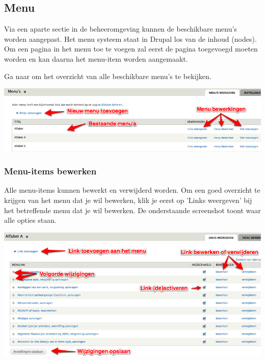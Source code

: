 \subsection{Menu}\label{menu}
Via een aparte sectie in de beheeromgeving kunnen de beschikbare menu's worden aangepast. Het menu systeem staat in Drupal los van de inhoud (nodes). Om een pagina in het menu toe te voegen zal eerst de pagina toegevoegd moeten worden en kan daarna het menu-item worden aangemaakt.

Ga naar  om het overzicht van alle beschikbare menu's te bekijken. 

\bigskip

\begin{center}
	\includegraphics[width=\textwidth]{img/menu1.png}
\end{center}

\subsubsection{Menu-items bewerken}\label{menuitemsbewerken}
Alle menu-items kunnen bewerkt en verwijderd worden. Om een goed overzicht te krijgen van het menu dat je wil bewerken, klik je eerst op 'Links weergeven' bij het betreffende menu dat je wil bewerken. De onderstaande screenshot toont waar alle opties staan.

\bigskip

\begin{center}
	\includegraphics[width=\textwidth]{img/menu2.png}
\end{center}

